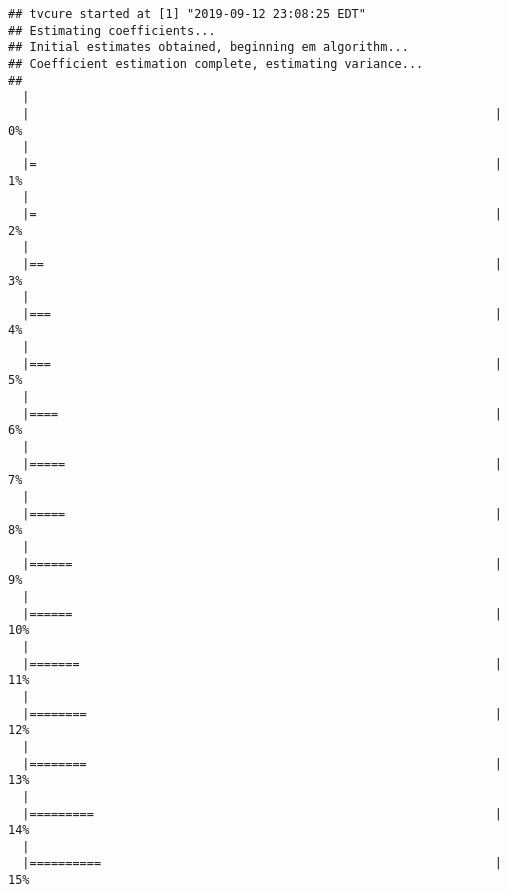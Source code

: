 \documentclass[]{article}
\begin{document}
\begin{verbatim}
## tvcure started at [1] "2019-09-12 23:08:25 EDT"
## Estimating coefficients...
## Initial estimates obtained, beginning em algorithm...
## Coefficient estimation complete, estimating variance...
## 
  |                                                                       
  |                                                                 |   0%
  |                                                                       
  |=                                                                |   1%
  |                                                                       
  |=                                                                |   2%
  |                                                                       
  |==                                                               |   3%
  |                                                                       
  |===                                                              |   4%
  |                                                                       
  |===                                                              |   5%
  |                                                                       
  |====                                                             |   6%
  |                                                                       
  |=====                                                            |   7%
  |                                                                       
  |=====                                                            |   8%
  |                                                                       
  |======                                                           |   9%
  |                                                                       
  |======                                                           |  10%
  |                                                                       
  |=======                                                          |  11%
  |                                                                       
  |========                                                         |  12%
  |                                                                       
  |========                                                         |  13%
  |                                                                       
  |=========                                                        |  14%
  |                                                                       
  |==========                                                       |  15%

\end{verbatim}
\end{document}
